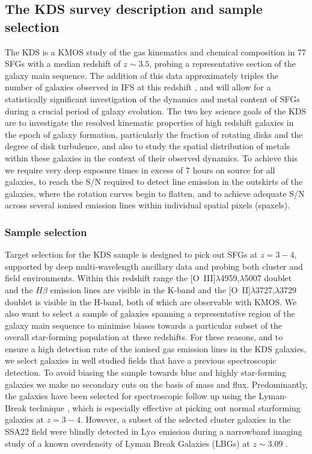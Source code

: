 \documentclass[fleqn,usenatbib]{mn2e}
\begin{document}
\subsection{The KDS survey description and sample selection}\label{subsec:survey_intro}
The KDS is a KMOS study of the gas kinematics and chemical composition in 77 SFGs with a median redshift of $z\sim3.5$, probing a representative section of the galaxy main sequence.
The addition of this data approximately triples the number of galaxies observed in IFS at this redshift \citep{Cresci2010,Lemoine-Busserolle2010,Gnerucci2011}, and will allow for a statistically significant investigation of the dynamics and metal content of SFGs during a crucial period of galaxy evolution. 
The two key science goals of the KDS are to investigate the resolved kinematic properties of high redshift galaxies in the epoch of galaxy formation, particularly the fraction of rotating disks and the degree of disk turbulence, and also to study the spatial distribution of metals within these galaxies in the context of their observed dynamics.
To achieve this we require very deep exposure times in excess of 7 hours on source for all galaxies, to reach the S/N required to detect line emission in the outskirts of the galaxies, where the rotation curves begin to flatten, and to achieve adequate S/N across several ionised emission lines within individual spatial pixels (spaxels).

\subsubsection{Sample selection}\label{subsubsec:sample_selection}
Target selection for the KDS sample is designed to pick out SFGs at $z = 3-4$, supported by deep multi-wavelength ancillary data and probing both cluster and field environments.
Within this redshift range the [O~{\sc III}]$\lambda$4959,$\lambda$5007 doublet and the $H\beta$ emission lines are visible in the K-band and the [O~{\sc II}]$\lambda$3727,$\lambda$3729 doublet is visible in the H-band, both of which are observable with KMOS. 
We also want to select a sample of galaxies spanning a representative region of the galaxy main sequence to minimise biases towards a particular subset of the overall star-forming population at these redshifts.
For these reasons, and to ensure a high detection rate of the ionised gas emission lines in the KDS galaxies, we select galaxies in well studied fields that have a previous spectroscopic detection.
To avoid biasing the sample towards blue and highly star-forming galaxies we make no secondary cuts on the basis of mass and flux.
Predominantly, the galaxies have been selected for spectroscopic follow up using the Lyman-Break technique \citep{Steidel1996}, which is especially effective at picking out normal starforming galaxies at $z = 3-4$.
However, a subset of the selected cluster galaxies in the SSA22 field were blindly detected in Ly$\alpha$ emission during a narrowband imaging study of a known overdensity of Lyman Break Galaxies (LBGs) at $z \sim 3.09$ \citep{Steidel2000}.
\end{document}
